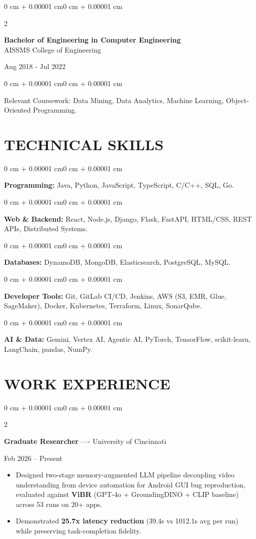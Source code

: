 \documentclass[10pt, letterpaper]{article}
\newenvironment{highlights}{
    \begin{itemize}[
        topsep=0.10 cm,
        parsep=0.06 cm,
        partopsep=0pt,
        itemsep=0.06 cm,
        leftmargin=12pt
    ]
}{
    \end{itemize}
}
\newenvironment{onecolentry}{
    \begin{adjustwidth}{0 cm + 0.00001 cm}{0 cm + 0.00001 cm}
}{
    \end{adjustwidth}
}
\newenvironment{twocolentry}[2][]{
    \onecolentry
    \def\secondColumn{#2}
    \setcolumnwidth{\fill, 4.5 cm}
    \begin{paracol}{2}
}{
    \switchcolumn \raggedleft \secondColumn
    \end{paracol}
    \endonecolentry
}
\begin{document}
\begin{twocolentry}{
    Aug 2018 - Jul 2022
}
    \textbf{Bachelor of Engineering in Computer Engineering} \\
    AISSMS College of Engineering
\end{twocolentry}
\begin{onecolentry}
Relevant Coursework: Data Mining, Data Analytics, Machine Learning, Object-Oriented Programming.
\end{onecolentry}
\section{TECHNICAL SKILLS}
\begin{onecolentry}
\textbf{Programming:} Java, Python, JavaScript, TypeScript, C/C++, SQL, Go.
\end{onecolentry}
\vspace{0.06 cm}
\begin{onecolentry}
\textbf{Web \& Backend:} React, Node.js, Django, Flask, FastAPI, HTML/CSS, REST APIs, Distributed Systems.
\end{onecolentry}
\vspace{0.06 cm}
\begin{onecolentry}
\textbf{Databases:} DynamoDB, MongoDB, Elasticsearch, PostgreSQL, MySQL.
\end{onecolentry}
\vspace{0.06 cm}
\begin{onecolentry}
\textbf{Developer Tools:} Git, GitLab CI/CD, Jenkins, AWS (S3, EMR, Glue, SageMaker), Docker, Kubernetes, Terraform, Linux, SonarQube.
\end{onecolentry}
\vspace{0.06 cm}
\begin{onecolentry}
\textbf{AI \& Data:} Gemini, Vertex AI, Agentic AI, PyTorch, TensorFlow, scikit-learn, LangChain, pandas, NumPy.
\end{onecolentry}

\section{WORK EXPERIENCE}
\begin{twocolentry}{Feb 2026 -- Present}
\textbf{Graduate Researcher} ---- University of Cincinnati
\end{twocolentry}
\begin{highlights}
  \item Designed two-stage memory-augmented LLM pipeline decoupling video understanding from device automation for Android GUI bug reproduction, evaluated against \textbf{ViBR} (GPT-4o + GroundingDINO + CLIP baseline) across 53 runs on 20+ apps.
  \item Demonstrated \textbf{25.7x latency reduction} (39.4s vs 1012.1s avg per run) while preserving task-completion fidelity.
\end{highlights}
\end{document}
